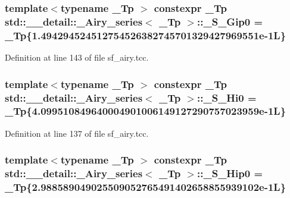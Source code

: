 \subsubsection[{\texorpdfstring{\+\_\+\+S\+\_\+\+Gip0}{_S_Gip0}}]{\setlength{\rightskip}{0pt plus 5cm}template$<$typename \+\_\+\+Tp $>$ constexpr \+\_\+\+Tp {\bf std\+::\+\_\+\+\_\+detail\+::\+\_\+\+Airy\+\_\+series}$<$ \+\_\+\+Tp $>$\+::\+\_\+\+S\+\_\+\+Gip0 = \+\_\+\+Tp\{1.\+494294524512754526382745701329427969551e-\/1\+L\}\hspace{0.3cm}{\ttfamily [static]}}\hypertarget{classstd_1_1____detail_1_1__Airy__series_aa2269595bf85d349e9e5a1e6e4abb1a4}{}\label{classstd_1_1____detail_1_1__Airy__series_aa2269595bf85d349e9e5a1e6e4abb1a4}


Definition at line 143 of file sf\+\_\+airy.\+tcc.

\subsubsection[{\texorpdfstring{\+\_\+\+S\+\_\+\+Hi0}{_S_Hi0}}]{\setlength{\rightskip}{0pt plus 5cm}template$<$typename \+\_\+\+Tp $>$ constexpr \+\_\+\+Tp {\bf std\+::\+\_\+\+\_\+detail\+::\+\_\+\+Airy\+\_\+series}$<$ \+\_\+\+Tp $>$\+::\+\_\+\+S\+\_\+\+Hi0 = \+\_\+\+Tp\{4.\+099510849640004901006149127290757023959e-\/1\+L\}\hspace{0.3cm}{\ttfamily [static]}}\hypertarget{classstd_1_1____detail_1_1__Airy__series_a9968426a52459123041f5fc11d73a854}{}\label{classstd_1_1____detail_1_1__Airy__series_a9968426a52459123041f5fc11d73a854}


Definition at line 137 of file sf\+\_\+airy.\+tcc.

\subsubsection[{\texorpdfstring{\+\_\+\+S\+\_\+\+Hip0}{_S_Hip0}}]{\setlength{\rightskip}{0pt plus 5cm}template$<$typename \+\_\+\+Tp $>$ constexpr \+\_\+\+Tp {\bf std\+::\+\_\+\+\_\+detail\+::\+\_\+\+Airy\+\_\+series}$<$ \+\_\+\+Tp $>$\+::\+\_\+\+S\+\_\+\+Hip0 = \+\_\+\+Tp\{2.\+988589049025509052765491402658855939102e-\/1\+L\}\hspace{0.3cm}{\ttfamily [static]}}\hypertarget{classstd_1_1____detail_1_1__Airy__series_a848fb790433db9dc427f9dd37a33da39}{}\label{classstd_1_1____detail_1_1__Airy__series_a848fb790433db9dc427f9dd37a33da39}


